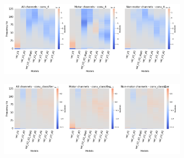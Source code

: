 \begin{figure}[!htpb]
\begin{subfigure}[b]{\textwidth}
   \includegraphics[width=1\linewidth]{img/appendix/D/conv-4/m/vel_model_gradients_all_kinds}
   \caption{}
   \label{fig:vel-pw-full-grads-conv-4}
\end{subfigure}

\begin{subfigure}[b]{\textwidth}
   \includegraphics[width=1\linewidth]{img/appendix/D/conv-classifier/m/vel_model_gradients_all_kinds}
   \caption{}
   \label{fig:vel-pw-full-grads-conv-classifier}
\end{subfigure}

\caption[]{}
\label{fig:vel-pw-full-grads}
\end{figure}
